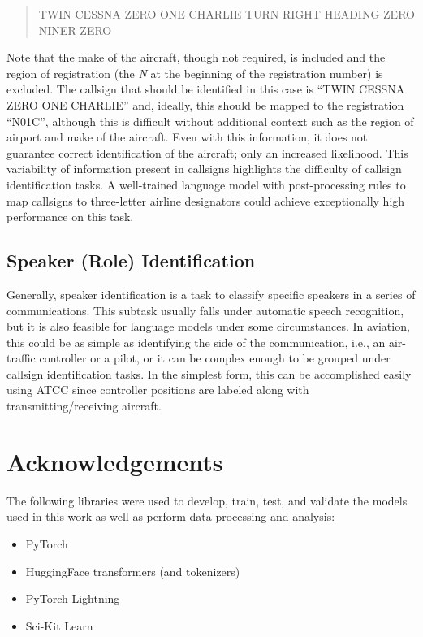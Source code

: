 \documentclass[12pt]{article}
\begin{document}
\begin{quote}
    TWIN CESSNA ZERO ONE CHARLIE TURN RIGHT HEADING ZERO NINER ZERO
\end{quote}

\noindent
Note that the make of the aircraft, though not required, is included and the region of registration (the \textit{N} at the beginning of the
registration number) is excluded. The callsign that should be identified in this case is ``TWIN CESSNA ZERO ONE CHARLIE'' and, ideally, this should
be mapped to the registration ``N01C'', although this is difficult without additional context such as the region of airport and make of the aircraft.
Even with this information, it does not guarantee correct identification of the aircraft; only an increased likelihood. This variability of
information present in callsigns highlights the difficulty of callsign identification tasks. A well-trained language model with post-processing rules
to map callsigns to three-letter airline designators could achieve exceptionally high performance on this task.

\subsection{Speaker (Role) Identification}
Generally, speaker identification is a task to classify specific speakers in a series of communications. This subtask
usually falls under automatic speech recognition, but it is also feasible for language models under some circumstances. In aviation, this could be as
simple as identifying the side of the communication, i.e., an air-traffic controller or a pilot, or it can be complex enough to be grouped under
callsign identification tasks. In the simplest form, this can be accomplished easily using ATCC since controller positions are labeled along with
transmitting/receiving aircraft.

\newpage
\section{Acknowledgements}
The following libraries were used to develop, train, test, and validate the models used in this work as well as perform data processing and analysis:
\begin{itemize}
    \item PyTorch \cite{paszke_pytorch_2019}
    \item HuggingFace transformers (and tokenizers) \cite{wolf_transformers_2020}
    \item PyTorch Lightning \cite{falcon_pytorchlightning_2019}
    \item Sci-Kit Learn \cite{pedregosa_scikit-learn_2011}
\end{itemize}
\end{document}
